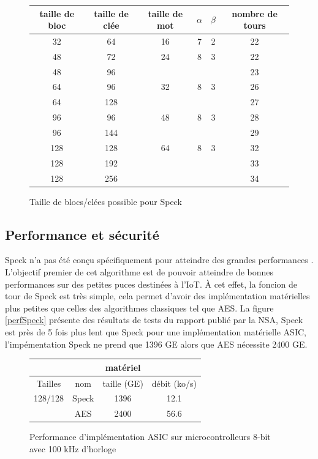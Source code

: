 		\begin{figure}[H]
			\centering
			\bgroup
			\def\arraystretch{1.2}
			\begin{tabular}{ccc|cc|c}
				taille de bloc & taille de clée & taille de mot & $\alpha$ & $\beta$ & nombre de tours \\
				\hline
				32 & 64  & 16 & 7 & 2 & 22 \\
				\hline
				48 & 72  & 24 & 8 & 3 & 22 \\
				48 & 96  &  & & & 23 \\
				\hline
				64 & 96  & 32 & 8 & 3 & 26 \\
				64 & 128 & &  & & 27 \\
				\hline
				96 & 96  & 48 & 8 & 3 & 28 \\
				96 & 144 & & & & 29 \\
				\hline
				128 & 128 & 64 & 8 & 3 & 32 \\
				128 & 192 & & & & 33 \\
				128 & 256 & & & & 34 \\
			\end{tabular}
			\egroup
			\caption{Taille de blocs/clées possible pour Speck}
		 	\label{tailleSpeck}
		\end{figure}

		\vspace{0.5cm}

		\subsection{Performance et sécurité}

			Speck n'a pas été conçu spécifiquement pour atteindre des grandes
			performances \cite{speck_families}. L'objectif premier de cet algorithme
			est de pouvoir atteindre de bonnes performances sur des petites puces
			destinées à l'IoT. À cet effet, la foncion de tour de Speck est très simple,
			cela permet d'avoir des implémentation matérielles plus petites que
			celles des algorithmes classiques tel que AES. La figure \ref{perfSpeck}
			présente des résultats de tests du rapport \cite{speck_micro} publié par la NSA,
			Speck est près de 5 fois plus lent que Speck pour une implémentation matérielle
			ASIC, l'impémentation Speck ne prend que 1396 GE alors que AES
			nécessite 2400 GE.

			\begin{figure}[H]
				\centering
				\bgroup
				\def\arraystretch{1.2}
				\begin{tabular}{cc|cc}
					& & \textbf{matériel} & \\
					\hline
					Tailles & nom & taille (GE) & débit (ko/s)\\
					\hline
					128/128 & Speck  & 1396 & 12.1 \\
					\hline
					 & AES  & 2400 & 56.6 \\
				\end{tabular}
				\egroup
				\caption{Performance d'implémentation ASIC sur microcontrolleurs 8-bit avec 100 kHz d'horloge \cite{speck_iot}}
				\label{tailleSpeck}
			\end{figure}

